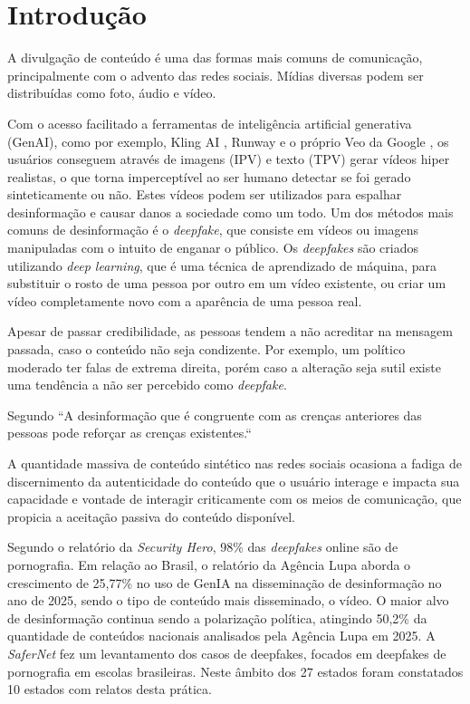\documentclass[12pt]{article}
\begin{document}
\section{Introdução}

A divulgação de conteúdo é uma das formas mais comuns de comunicação,
principalmente com o advento das redes sociais. Mídias diversas podem ser distribuídas como foto, áudio e vídeo.

Com o acesso facilitado a ferramentas de inteligência artificial generativa (GenAI),
como por exemplo, Kling AI \cite{KlingAINextGeneration} , Runway \cite{RunwayBuildingAI} e o próprio Veo da Google \cite{Veo3Google},
os usuários conseguem através de imagens (IPV) e texto (TPV) gerar vídeos hiper realistas,
o que torna imperceptível ao ser humano detectar se foi gerado sinteticamente ou não.
Estes vídeos podem ser utilizados para espalhar desinformação e causar danos a sociedade como um todo.
Um dos métodos mais comuns de desinformação é o \textit{deepfake}, que consiste em vídeos ou imagens manipuladas com o intuito de enganar o público.
Os \textit{deepfakes} são criados utilizando \textit{deep learning}, que é uma técnica de aprendizado de máquina,
para substituir o rosto de uma pessoa por outro em um vídeo existente, 
ou criar um vídeo completamente novo com a aparência de uma pessoa real. \cite{dagarLiteratureReviewPerspectives2022a}

Apesar de passar credibilidade, as pessoas tendem a não acreditar na mensagem passada,
caso o conteúdo não seja condizente. Por exemplo, um político moderado ter falas de extrema direita,
porém caso a alteração seja sutil existe uma tendência a não ser percebido como \textit{deepfake}.
\cite{hameleersYouWontBelieve2022,hameleersTheyWouldNever2024}

Segundo \textcite[p.~10]{hameleersYouWontBelieve2022} “A desinformação que é congruente com as crenças anteriores das pessoas
pode reforçar as crenças existentes.“

A quantidade massiva de conteúdo sintético nas redes sociais ocasiona a fadiga de discernimento
da autenticidade do conteúdo que o usuário interage e impacta sua capacidade
e vontade de interagir criticamente com os meios de comunicação,
que propicia a aceitação passiva do conteúdo disponível. \cite{liuWhenSeeingNot2025a}

Segundo o relatório da \textit{Security Hero}, 98\% das \textit{deepfakes} online são de pornografia. \cite{2023StateDeepfakes}
Em relação ao Brasil, o relatório da Agência Lupa aborda o crescimento de 25,77\% 
no uso de GenIA na disseminação de desinformação no ano de 2025, sendo o tipo de conteúdo mais disseminado, o vídeo.
O maior alvo de desinformação continua sendo a polarização política, atingindo 50,2\% 
da quantidade de conteúdos nacionais analisados pela Agência Lupa em 2025. \cite{correaPanoramaDesinformacaoNo2026}
A \textit{SaferNet} fez um levantamento dos casos de deepfakes,
focados em deepfakes de pornografia em escolas brasileiras. Neste âmbito dos 27 estados foram constatados 10 estados
com relatos desta prática. \cite{MapeamentoSaferNetIdentificaa}
\end{document}
